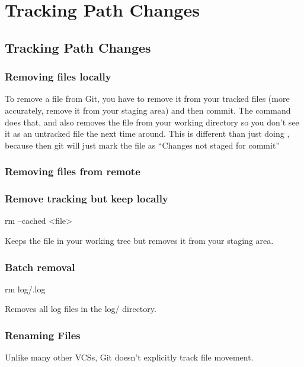 
\chapter{Tracking Path Changes}
\chapteroverlayB

\section{Tracking Path Changes}
\subsection{Removing files locally}
To remove a file from Git, you have to remove it from your tracked files (more accurately, remove it from your staging area) and then commit. The  command does that, and also removes the file from your working directory so you don’t see it as an untracked file the next time around.\newline
This is different than just doing , because then git will just mark the file as “Changes not staged for commit”

\subsection{Removing files from remote}

\subsection{Remove tracking but keep locally}

\begin{gitBashBox}
rm --cached <file>    
\end{gitBashBox}
Keeps the file in your working tree but removes it from your staging area.

\subsection{Batch removal}
\begin{gitBashBox}
rm log/\*.log
\end{gitBashBox}\footnotemark
Removes all log files in the log/ directory.




\subsection{Renaming Files}
Unlike many other VCSs, Git doesn’t explicitly track file movement.

